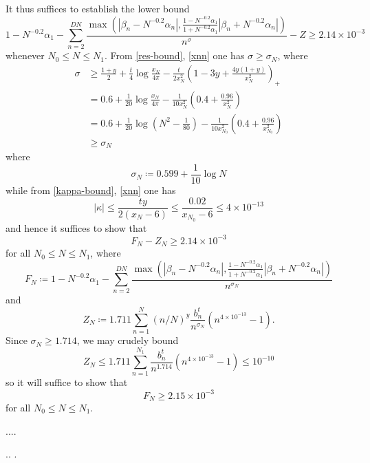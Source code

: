 It thus suffices to establish the lower bound
$$ 1 - N^{-0.2} \alpha_1 - \sum_{n=2}^{DN} \frac{\max(|\beta_n-N^{-0.2} \alpha_n|, \frac{1-N^{-0.2} \alpha_1}{1+N^{-0.2} \alpha_1} |\beta_n+N^{-0.2} \alpha_n|)}{n^{\sigma}} - Z
\geq 2.14 \times 10^{-3}$$
whenever $N_0 \leq N \leq N_1$.  From \eqref{res-bound}, \eqref{xnn} one has $\sigma \geq \sigma_{N}$, where
\begin{align*}
 \sigma &\geq \frac{1+y}{2} +\frac{t}{4} \log \frac{x_N}{4\pi} - \frac{t}{2x_N^2} \left(1-3y+\frac{4y(1+y)}{x_N^2}\right)_+ \\
&= 0.6 + \frac{1}{20} \log \frac{x_N}{4\pi} - \frac{1}{10 x_N^2} ( 0.4 + \frac{0.96}{x_N^2} ) \\
&= 0.6 + \frac{1}{20} \log (N^2 - \frac{1}{80}) - \frac{1}{10 x_{N_0}^2} ( 0.4 + \frac{0.96}{x_{N_0}^2} ) \\
&\geq \sigma_N
\end{align*}
where
$$ \sigma_N \coloneqq 0.599 + \frac{1}{10} \log N $$
while from \eqref{kappa-bound}, \eqref{xnn} one has
$$ |\kappa| \leq \frac{ty}{2(x_N-6)} \leq \frac{0.02}{x_{N_0}-6} \leq 4 \times 10^{-13}$$
and hence it suffices to show that
$$ F_{N} - Z_{N} \geq 2.14 \times 10^{-3}$$
for all $N_0 \leq N \leq N_1$, where
$$ F_{N} \coloneqq 1 - N^{-0.2} \alpha_1 - \sum_{n=2}^{DN} \frac{\max(|\beta_n-N^{-0.2} \alpha_n|, \frac{1-N^{-0.2} \alpha_1}{1+N^{-0.2} \alpha_1} |\beta_n+N^{-0.2} \alpha_n|)}{n^{\sigma_N}}$$
and
$$ Z_{N} \coloneqq 1.711 \sum_{n=1}^N (n/N)^y \frac{b_n^t}{n^{\sigma_{N}}} (n^{4 \times 10^{-13}}-1).$$
Since $\sigma_N \geq 1.714$, we may crudely bound
$$ Z_N \leq 1.711 \sum_{n=1}^{N_1} \frac{b_n^t}{n^{1.714}} (n^{4 \times 10^{-13}}-1) \leq 10^{-10}$$
so it will suffice to show that
$$ F_N \geq 2.15 \times 10^{-3}$$
for all $N_0 \leq N \leq N_1$.

....









.. .



